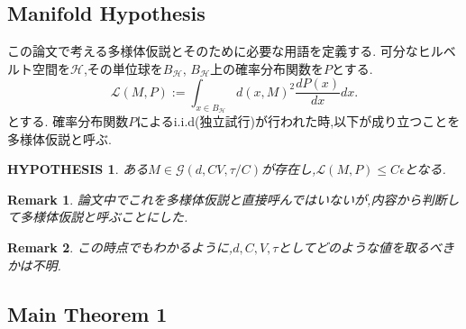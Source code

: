 \documentclass{jarticle}
\newtheorem*{rem}{Remark}
\newtheorem{hyp}{HYPOTHESIS}
\begin{document}
\subsection{Manifold Hypothesis}
\label{sub:多様体仮説}
この論文で考える多様体仮説とそのために必要な用語を定義する.
可分なヒルベルト空間を$\mathcal{H}$,その単位球を$B_{\mathcal{H}}$,
$B_{\mathcal{H}}$上の確率分布関数を$P$とする.
\begin{equation*}
 \mathcal{L}(M,P):=\int_{x \in B_{\mathcal{H}}} d(x,M)^2\frac{dP(x)}{dx}dx.
\end{equation*}
とする.
確率分布関数$P$によるi.i.d(独立試行)が行われた時,以下が成り立つことを多様体仮説と呼ぶ.
\begin{hyp}
  ある$M \in \mathcal{G}(d,CV,\tau/C)$が存在し,$\mathcal{L}(M,P) \le C \epsilon$となる.
\end{hyp}
\begin{rem}
 論文中でこれを多様体仮説と直接呼んではいないが,内容から判断して多様体仮説と呼ぶことにした.
\end{rem}
\begin{rem}
 この時点でもわかるように,$d,C,V,\tau$としてどのような値を取るべきかは不明.
\end{rem}

\subsection{Main Theorem 1}
\label{sub:主結果その1}
\end{document}
